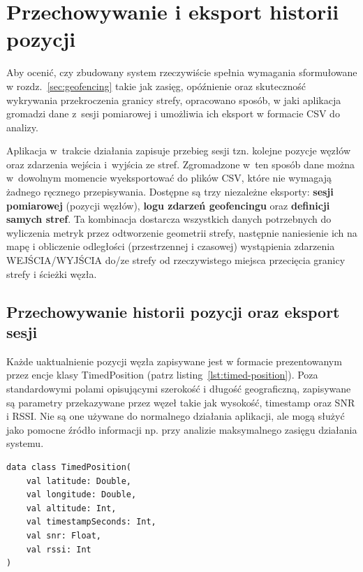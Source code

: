 \newpage
\section{Przechowywanie i eksport historii pozycji}
\label{sec:historia-eksport}

Aby ocenić, czy zbudowany system rzeczywiście spełnia wymagania sformułowane w rozdz.~\ref{sec:geofencing} takie jak zasięg, opóźnienie oraz skuteczność wykrywania przekroczenia
granicy strefy, opracowano sposób, w jaki aplikacja gromadzi dane z~sesji pomiarowej i umożliwia ich eksport w formacie CSV do analizy.

Aplikacja w~trakcie działania zapisuje przebieg sesji tzn. kolejne pozycje węzłów oraz zdarzenia wejścia i~wyjścia ze stref.  Zgromadzone w~ten sposób dane można w~dowolnym momencie wyeksportować do plików CSV, które nie wymagają żadnego ręcznego przepisywania. Dostępne są trzy niezależne eksporty: \textbf{sesji pomiarowej }(pozycji węzłów), \textbf{logu zdarzeń geofencingu} oraz \textbf{definicji samych stref}.  Ta kombinacja dostarcza wszystkich danych potrzebnych do wyliczenia metryk przez odtworzenie geometrii strefy, następnie naniesienie ich na mapę i obliczenie odległości (przestrzennej i czasowej) wystąpienia zdarzenia WEJŚCIA/WYJŚCIA do/ze strefy od rzeczywistego miejsca przecięcia granicy strefy i ścieżki węzła. 

\subsection*{Przechowywanie historii pozycji oraz eksport sesji}
\label{sec:historia}

Każde uaktualnienie pozycji węzła zapisywane jest w formacie prezentowanym przez encje klasy TimedPosition (patrz listing~\ref{lst:timed-position}). Poza standardowymi polami opisującymi szerokość i długość geograficzną, zapisywane są parametry przekazywane przez węzeł takie jak wysokość, timestamp oraz SNR i RSSI. Nie są one używane do normalnego działania aplikacji, ale mogą służyć jako pomocne źródło informacji np. przy analizie maksymalnego zasięgu działania systemu.

\begin{lstlisting}[caption={Klasa \texttt{TimedPosition} - pojedynczy punkt historii},
                   label={lst:timed-position}]
data class TimedPosition(
    val latitude: Double,
    val longitude: Double,
    val altitude: Int,
    val timestampSeconds: Int,
    val snr: Float,
    val rssi: Int
)
\end{lstlisting}

